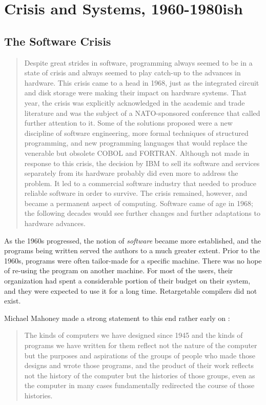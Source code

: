 \chapter{Crisis and Systems, 1960-1980ish}


\section{The Software Crisis}
\begin{quotation}
Despite great strides in software, programming always seemed to be in a state 
of crisis and always seemed to play catch-up to the advances in hardware. This 
crisis came to a head in 1968, just as the integrated circuit and disk storage 
were making their impact on hardware systems. That year, the crisis was 
explicitly acknowledged in the academic and trade literature and was the 
subject of a NATO-sponsored conference that called further attention to it. 
Some of the solutions proposed were a new discipline of software engineering, 
more formal techniques of structured programming, and new programming languages 
that would replace the venerable but obsolete COBOL and FORTRAN. Although not 
made in response to this crisis, the decision by IBM to sell its software and 
services separately from its hardware probably did even more to address the 
problem. It led to a commercial software industry that needed to produce 
reliable software in order to survive. The crisis remained, however, and became 
a permanent aspect of computing. Software came of age in 1968; the following 
decades would see further changes and further adaptations to hardware advances.
\cite{history_of_modern_computing_2003_ceruzzi}
\end{quotation}


As the 1960s progressed, the notion of \textit{software} became more established,
and the programs being written served the authors to a much greater extent.
Prior to the 1960s, programs were often tailor-made for a specific machine.
There was no hope of re-using the program on another machine.
For most of the users, their organization had spent a considerable portion
of their budget on their system, and they were expected to use it for a long time.
Retargetable compilers did not exist.

Michael Mahoney made a strong statement to this end rather early on \cite[The Structures of Computation]{the-first-computers-2002}:
\begin{quotation}
The kinds of computers we have designed since 1945 and the kinds of programs we 
have written for them reflect not the nature of the computer but the purposes 
and aspirations of the groups of people who made those designs and wrote those 
programs, and the product of their work reflects not the history of the 
computer but the histories of those groups, even as the computer in many cases 
fundamentally redirected the course of those histories.
\end{quotation}

